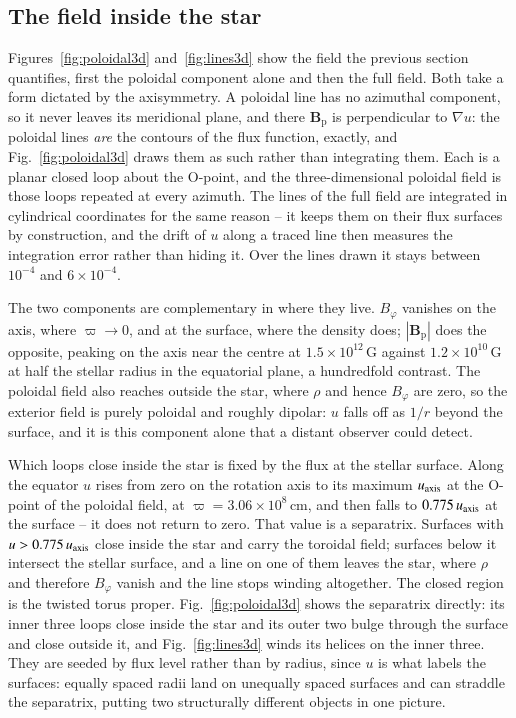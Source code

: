 \documentclass{aa}
\begin{document}
\subsection{The field inside the star}
\label{sec:structure}

Figures~\ref{fig:poloidal3d} and~\ref{fig:lines3d} show the field the
previous section quantifies, first the poloidal component alone and then
the full field. Both take a form dictated by the axisymmetry. A poloidal
line has no azimuthal component, so it never leaves its meridional plane,
and there $\mathbf{B}_{\mathrm{p}}$ is perpendicular to $\nabla u$: the
poloidal lines \emph{are} the contours of the flux function, exactly, and
Fig.~\ref{fig:poloidal3d} draws them as such rather than integrating
them. Each is a planar closed loop about the O-point, and the
three-dimensional poloidal field is those loops repeated at every
azimuth. The lines of the full field are integrated in cylindrical
coordinates for the same reason -- it keeps them on their flux surfaces
by construction, and the drift of $u$ along a traced line then measures
the integration error rather than hiding it. Over the lines drawn it
stays between $10^{-4}$ and $6\times10^{-4}$.

The two components are complementary in where they live. $B_\varphi$
vanishes on the axis, where $\varpi \to 0$, and at the surface, where the
density does; $|\mathbf{B}_{\mathrm{p}}|$ does the opposite, peaking on
the axis near the centre at $1.5\times10^{12}\,$G against
$1.2\times10^{10}\,$G at half the stellar radius in the equatorial plane,
a hundredfold contrast. The poloidal field also reaches outside the star,
where $\rho$ and hence $B_\varphi$ are zero, so the exterior field is
purely poloidal and roughly dipolar: $u$ falls off as $1/r$ beyond the
surface, and it is this component alone that a distant observer could
detect.

Which loops close inside the star is fixed by the flux at the stellar
surface. Along the equator $u$ rises from zero on the rotation axis to
its maximum $u_{\rm axis}$ at the O-point of the poloidal field, at
$\varpi = 3.06\times10^{8}\,$cm, and then falls to $0.775\,u_{\rm axis}$
at the surface -- it does not return to zero. That value is a separatrix.
Surfaces with $u > 0.775\,u_{\rm axis}$ close inside the star and carry
the toroidal field; surfaces below it intersect the stellar surface, and
a line on one of them leaves the star, where $\rho$ and therefore
$B_\varphi$ vanish and the line stops winding altogether. The closed
region is the twisted torus proper. Fig.~\ref{fig:poloidal3d} shows the
separatrix directly: its inner three loops close inside the star and its
outer two bulge through the surface and close outside it, and
Fig.~\ref{fig:lines3d} winds its helices on the inner three. They are seeded by flux level
rather than by radius, since $u$ is what labels the surfaces: equally
spaced radii land on unequally spaced surfaces and can straddle the
separatrix, putting two structurally different objects in one picture.
\end{document}
